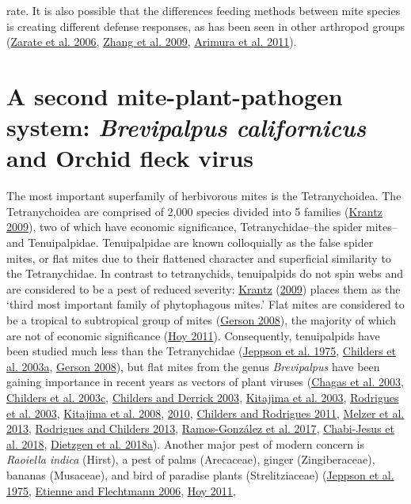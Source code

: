 \documentclass[12pt,final,CPage]{ufthesis}
\begin{document}
{rate. It is also possible that the differences feeding methods between mite species is creating different defense responses, as has been seen in other arthropod groups (\protect\hyperlink{ref-Zarate2006}{Zarate et al. 2006}, \protect\hyperlink{ref-Zhang2009}{Zhang et al. 2009}, \protect\hyperlink{ref-Arimura2011}{Arimura et al. 2011}).

  \hypertarget{litrev-brevi}{%
  \section{\texorpdfstring{A second mite-plant-pathogen system: \emph{Brevipalpus californicus} and Orchid fleck virus}{A second mite-plant-pathogen system: Brevipalpus californicus and Orchid fleck virus}}\label{litrev-brevi}}

  The most important superfamily of herbivorous mites is the Tetranychoidea. The Tetranychoidea are comprised of 2,000 species divided into 5 families (\protect\hyperlink{ref-Krantz2009}{Krantz 2009}), two of which have economic significance, Tetranychidae--the spider mites--and Tenuipalpidae. Tenuipalpidae are known colloquially as the false spider mites, or flat mites due to their flattened character and superficial similarity to the Tetranychidae. In contrast to tetranychids, tenuipalpids do not spin webs and are considered to be a pest of reduced severity: \protect\hyperlink{ref-Krantz2009}{Krantz} (\protect\hyperlink{ref-Krantz2009}{2009}) places them as the `third most important family of phytophagous mites.' Flat mites are considered to be a tropical to subtropical group of mites (\protect\hyperlink{ref-Gerson2008}{Gerson 2008}), the majority of which are not of economic significance (\protect\hyperlink{ref-Hoy2011}{Hoy 2011}). Consequently, tenuipalpids have been studied much less than the Tetranychidae (\protect\hyperlink{ref-Jeppson1975}{Jeppson et al. 1975}, \protect\hyperlink{ref-Childers2003b}{Childers et al. 2003a}, \protect\hyperlink{ref-Gerson2008}{Gerson 2008}), but flat mites from the genus \emph{Brevipalpus} have been gaining importance in recent years as vectors of plant viruses (\protect\hyperlink{ref-Chagas2003}{Chagas et al. 2003}, \protect\hyperlink{ref-Childers2003a}{Childers et al. 2003c}, \protect\hyperlink{ref-Childers2003c}{Childers and Derrick 2003}, \protect\hyperlink{ref-Kitajima2003b}{Kitajima et al. 2003}, \protect\hyperlink{ref-Rodrigues2003a}{Rodrigues et al. 2003}, \protect\hyperlink{ref-Kitajima2008}{Kitajima et al. 2008}, \protect\hyperlink{ref-Kitajima2010}{2010}, \protect\hyperlink{ref-Childers2011}{Childers and Rodrigues 2011}, \protect\hyperlink{ref-Melzer2013}{Melzer et al. 2013}, \protect\hyperlink{ref-Rodrigues2013}{Rodrigues and Childers 2013}, \protect\hyperlink{ref-RamosGonzalez2017}{Ramos-González et al. 2017}, \protect\hyperlink{ref-ChabiJesus2018}{Chabi-Jesus et al. 2018}, \protect\hyperlink{ref-Dietzgen2018}{Dietzgen et al. 2018a}). Another major pest of modern concern is \emph{Raoiella indica} (Hirst), a pest of palms (Arecaceae), ginger (Zingiberaceae), bananas (Musaceae), and bird of paradise plants (Strelitziaceae) (\protect\hyperlink{ref-Jeppson1975}{Jeppson et al. 1975}, \protect\hyperlink{ref-Etienne2006}{Etienne and Flechtmann 2006}, \protect\hyperlink{ref-Hoy2011}{Hoy 2011}, }
\end{document}
